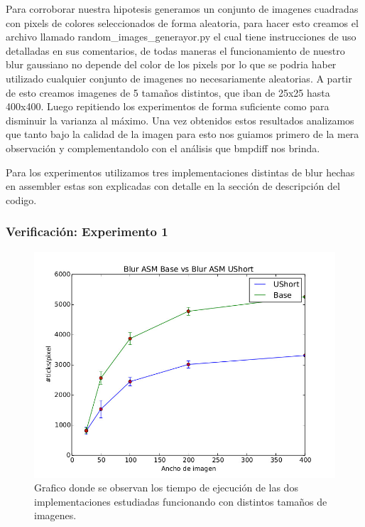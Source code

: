Para corroborar nuestra hipotesis generamos un conjunto de imagenes cuadradas
con pixels de colores seleccionados de forma aleatoria, para hacer esto creamos
el archivo llamado random\_images\_generayor.py el cual tiene instrucciones de
uso detalladas en sus comentarios, de todas maneras el funcionamiento de nuestro
blur gaussiano no depende del color de los pixels por lo que se podria haber
utilizado cualquier conjunto de imagenes no necesariamente aleatorias. A partir
de esto creamos imagenes de 5 tamaños distintos, que iban de 25x25 hasta
400x400. Luego repitiendo los experimentos de forma suficiente como para
disminuir la varianza al máximo. Una vez obtenidos estos resultados analizamos
que tanto bajo la calidad de la imagen para esto nos guiamos primero de la mera
observación y complementandolo con el análisis que bmpdiff nos brinda.

Para los experimentos utilizamos tres implementaciones distintas de blur hechas
en assembler estas son explicadas con detalle en la sección de descripción del
codigo.

\subsubsection{Verificación: Experimento 1}


\begin{figure}[H]
\centering
    \includegraphics[scale=0.5]{imgs/blur_ushort.jpg}
  \caption{\footnotesize{Grafico donde se observan los tiempo de ejecución de las dos implementaciones estudiadas funcionando con distintos tamaños de imagenes.}}
  \label{fig:tiempo2}
\end{figure}

